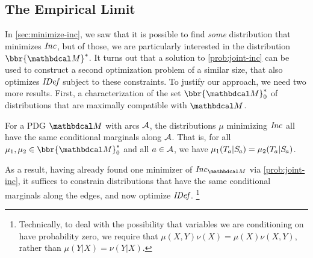 \documentclass[twoside]{article}
\begin{document}
\subsection{The Empirical Limit}
    \label{sec:empirical-limit}
    
In \cref{sec:minimize-inc}, we
saw that it is possible to find \emph{some} distribution that minimizes $\mathit{Inc}$,
but of those, we are particularly interested in the distribution $\bbr{\dg M}^*$.
It turns out that a solution to \eqref{prob:joint-inc} can be used to construct a second optimization problem of a similar size, that also optimizes $\mathit{IDef}_{\!}$ subject to these constraints.
To justify our approach, we need two more results.
First, a characterization of the set $\bbr{\dg M}^*_0$ of distributions that are maximally compatible with $\dg M$. 


\begin{prop}\label{prop:marginonly}
    For a PDG $\dg M$ with arcs $\mathcal A$,
    the distributions $\mu$ minimizing $\mathit{Inc}$ all have the same conditional
        marginals along $\mathcal A$.
    That is, for all $\mu_1, \mu_2 \in \bbr{\dg M}_0^*$
    and all $a \in \mathcal A$, 
    we have
    $\mu_1(\Tgt a | \Src a) = \mu_2(\Tgt a | \Src a)$. 
\end{prop}

As a result, having already found one minimizer of $\Inc_{\dg M}$ via \eqref{prob:joint-inc}, it suffices to constrain distributions that have the same conditional marginals along the edges, and now optimize $\mathit{IDef}_{\!}$.%
    \footnote{
        Technically, to deal with the possibility that variables we
        are conditioning on have probability zero,  
        we require that $\mu(X,Y)\nu(X) = \mu(X) \nu(X,Y)$, rather than 
        $\mu(Y|X) = \nu(Y|X)$.
    }
\end{document}
